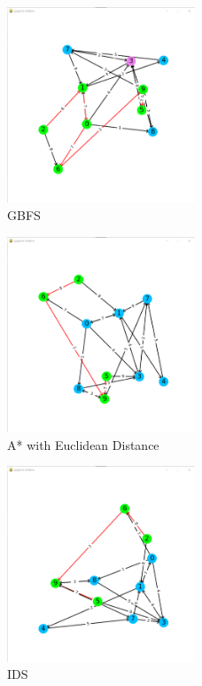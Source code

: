 \begin{figure}[h!]
    \centering
    \includegraphics[width=0.5\textwidth]{result/testcase1/greedy.png}
    \caption{GBFS}
\end{figure}
\begin{figure}[h!]
    \centering
    \includegraphics[width=0.5\textwidth]{result/testcase1/astar.png}
    \caption{A* with Euclidean Distance}
\end{figure}
\begin{figure}[h!]
    \centering
    \includegraphics[width=0.5\textwidth]{result/testcase1/ids.png}
    \caption{IDS}
\end{figure}

